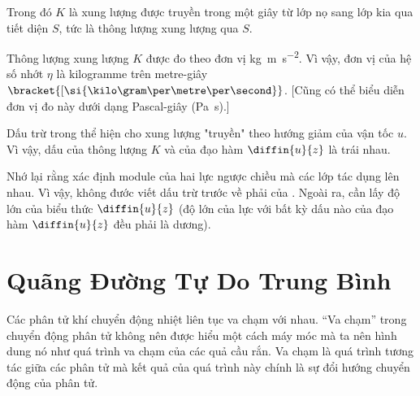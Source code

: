 \noindent
Trong đó $K$ là xung lượng được truyền trong một giây từ lớp nọ sang lớp kia qua tiết diện $S$, tức là thông lượng xung lượng qua $S$.

Thông lượng xung lượng $K$ được đo theo đơn vị \si{\kilo\gram\metre\per\second\squared}. Vì vậy, đơn vị của hệ số nhớt $\eta$ là kilogramme trên metre-giây $\bracket{[\si{\kilo\gram\per\metre\per\second}}$. [Cũng có thể biểu diễn đơn vị đo này dưới dạng Pascal-giây (\si{\pascal\second}).]

Dấu trừ trong  thể hiện cho xung lượng "truyền" theo hướng giảm của vận tốc $u$. Vì vậy, dấu của thông lượng $K$ và của đạo hàm $\diffin{u}{z}$ là trái nhau.

Nhớ lại rằng  xác định module của hai lực ngược chiều mà các lớp tác dụng lên nhau. Vì vậy, không đước viết dấu trừ trước về phải của . Ngoài ra, cần lấy độ lớn của biểu thức $\diffin{u}{z}$ (độ lớn của lực với bất kỳ dấu nào của đạo hàm $\diffin{u}{z}$ đều phải là dương).

\section{Quãng Đường Tự Do Trung Bình}\label{sec:16_2}

Các phân tử khí chuyển động nhiệt liên tục va chạm với nhau. ``Va chạm'' trong chuyển động phân tử không nên được hiểu một cách máy móc mà ta nên hình dung nó như quá trình va chạm của các quả cầu rắn. Va chạm là quá trình tương tác giữa các phân tử mà kết quả của quá trình này chính là sự đổi hướng chuyển động của phân tử.

